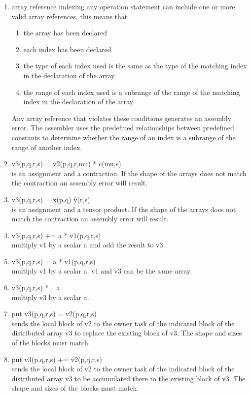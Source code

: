 \documentclass[12pt]{article}
\begin{document}
\begin{enumerate}
\item array reference indexing any operation statement can include one or more valid 
array references, this means that
\begin{enumerate} 
\item the array has been declared
\item each index has been declared
\item the type of each index used is the same as the type of the matching index in the 
  declaration of the array
\item the range of each index used is a subrange of the range of the matching index in 
  the declaration of the array
\end{enumerate} 
Any array reference that violates these conditions generates an assembly error. The 
assembler uses the predefined relationships between predefined constants to determine 
whether the range of an index is a subrange of the range of another index.

\item v3(p,q,r,s) = v2(p,q,r,mu) * c(mu,s)\\ 
is an assignment and a contraction. If the shape of the arrays does not match the contraction 
an assembly error will result.

\item v3(p,q,r,s) = x(p,q) \^ y(r,s)\\ 
is an assignment and a tensor product. If the shape of the arrays does not match the 
contraction an assembly error will result.

\item v3(p,q,r,s) += a * v1(p,q,r,s)\\ 
multiply v1 by a scalar a and add the result to v3.

\item v3(p,q,r,s) = a * v1(p,q,r,s)\\ 
multiply v1 by a scalar a. v1 and v3 can be the same array.

\item v3(p,q,r,s) *= a\\ 
multiply v3 by a scalar a.

\item put v3(p,q,r,s) = v2(p,q,r,s)\\ 
sends the local block of v2 to the owner task of the indicated block of the distributed 
array v3 to replace the existing block of v3. The shape and sizes of the blocks must match.

\item put v3(p,q,r,s) += v2(p,q,r,s)\\ 
sends the local block of v2 to the owner task of the indicated block of the distributed 
array v3 to be accumulated there to the existing block of v3. The shape and sizes of the 
blocks must match.


\end{enumerate}
\end{document}
